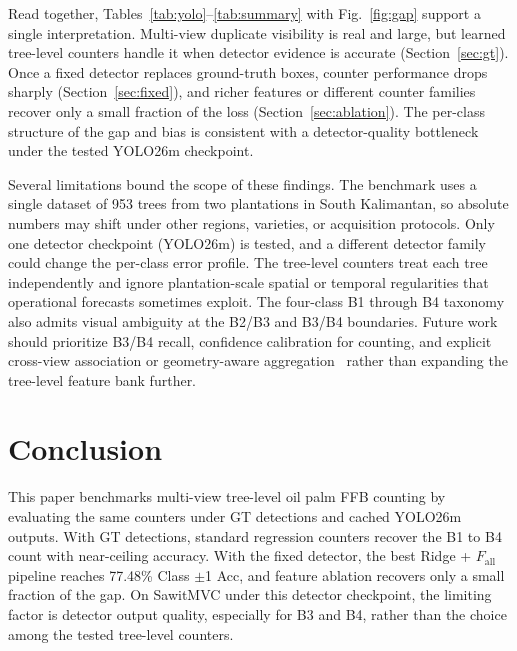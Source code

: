 \documentclass[conference]{IEEEtran}
\begin{document}
Read together, Tables~\ref{tab:yolo}--\ref{tab:summary} with
Fig.~\ref{fig:gap} support a single interpretation. Multi-view duplicate
visibility is real and large, but learned tree-level counters handle it when
detector evidence is accurate (Section~\ref{sec:gt}). Once a fixed detector
replaces ground-truth boxes, counter performance drops sharply
(Section~\ref{sec:fixed}), and richer features or different counter families
recover only a small fraction of the loss (Section~\ref{sec:ablation}). The
per-class structure of the gap and bias is consistent with a detector-quality
bottleneck under the tested YOLO26m checkpoint.

Several limitations bound the scope of these findings. The benchmark uses a
single dataset of 953 trees from two plantations in South Kalimantan, so
absolute numbers may shift under other regions, varieties, or acquisition
protocols. Only one detector checkpoint (YOLO26m) is tested, and a different
detector family could change the per-class error profile. The tree-level
counters treat each tree independently and ignore plantation-scale spatial or
temporal regularities that operational forecasts sometimes exploit. The
four-class B1 through B4 taxonomy also admits visual ambiguity at the B2/B3 and
B3/B4 boundaries. Future work should prioritize B3/B4 recall, confidence
calibration for counting, and explicit cross-view association or geometry-aware
aggregation~\cite{ref2,ref3,ref4} rather than expanding the tree-level feature
bank further.

\section{Conclusion}

This paper benchmarks multi-view tree-level oil palm FFB counting by evaluating
the same counters under GT detections and cached YOLO26m outputs. With GT
detections, standard regression counters recover the B1 to B4 count with
near-ceiling accuracy. With the fixed detector, the best Ridge +
$F_{\text{all}}$ pipeline reaches 77.48\% Class $\pm$1 Acc, and feature
ablation recovers only a small fraction of the gap. On SawitMVC under this
detector checkpoint, the limiting factor is detector output quality, especially
for B3 and B4, rather than the choice among the tested tree-level counters.

\end{document}
